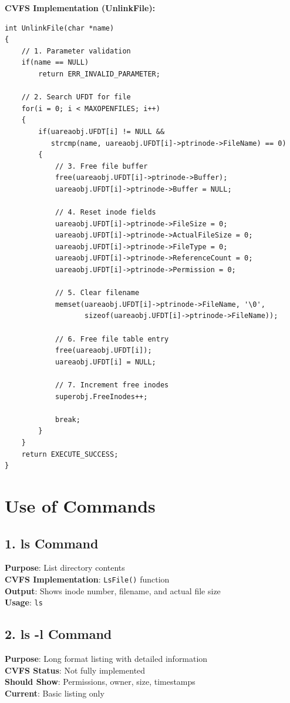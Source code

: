 \documentclass[11pt,a4paper]{article}
\begin{document}
\textbf{CVFS Implementation (UnlinkFile):}
\begin{lstlisting}
int UnlinkFile(char *name)
{
    // 1. Parameter validation
    if(name == NULL)
        return ERR_INVALID_PARAMETER;
    
    // 2. Search UFDT for file
    for(i = 0; i < MAXOPENFILES; i++)
    {
        if(uareaobj.UFDT[i] != NULL && 
           strcmp(name, uareaobj.UFDT[i]->ptrinode->FileName) == 0)
        {
            // 3. Free file buffer
            free(uareaobj.UFDT[i]->ptrinode->Buffer);
            uareaobj.UFDT[i]->ptrinode->Buffer = NULL;
            
            // 4. Reset inode fields
            uareaobj.UFDT[i]->ptrinode->FileSize = 0;
            uareaobj.UFDT[i]->ptrinode->ActualFileSize = 0;
            uareaobj.UFDT[i]->ptrinode->FileType = 0;
            uareaobj.UFDT[i]->ptrinode->ReferenceCount = 0;
            uareaobj.UFDT[i]->ptrinode->Permission = 0;
            
            // 5. Clear filename
            memset(uareaobj.UFDT[i]->ptrinode->FileName, '\0', 
                   sizeof(uareaobj.UFDT[i]->ptrinode->FileName));
            
            // 6. Free file table entry
            free(uareaobj.UFDT[i]);
            uareaobj.UFDT[i] = NULL;
            
            // 7. Increment free inodes
            superobj.FreeInodes++;
            
            break;
        }
    }
    return EXECUTE_SUCCESS;
}
\end{lstlisting}

\section{Use of Commands}

\subsection{1. ls Command}
\textbf{Purpose}: List directory contents\\
\textbf{CVFS Implementation}: \texttt{LsFile()} function\\
\textbf{Output}: Shows inode number, filename, and actual file size\\
\textbf{Usage}: \texttt{ls}

\subsection{2. ls -l Command}
\textbf{Purpose}: Long format listing with detailed information\\
\textbf{CVFS Status}: Not fully implemented\\
\textbf{Should Show}: Permissions, owner, size, timestamps\\
\textbf{Current}: Basic listing only
\end{document}
